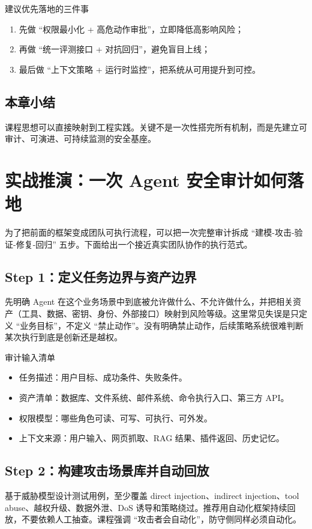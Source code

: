 \documentclass[a4paper]{article}
\begin{document}
\begin{knowledgebox}{建议优先落地的三件事}
\begin{enumerate}
    \item 先做 ``权限最小化 + 高危动作审批''，立即降低高影响风险；
    \item 再做 ``统一评测接口 + 对抗回归''，避免盲目上线；
    \item 最后做 ``上下文策略 + 运行时监控''，把系统从可用提升到可控。
\end{enumerate}
\end{knowledgebox}

\subsection{本章小结}
课程思想可以直接映射到工程实践。关键不是一次性搭完所有机制，而是先建立可审计、可演进、可持续监测的安全基座。

\section{实战推演：一次 Agent 安全审计如何落地}

为了把前面的框架变成团队可执行流程，可以把一次完整审计拆成 ``建模-攻击-验证-修复-回归'' 五步。下面给出一个接近真实团队协作的执行范式。

\subsection{Step 1：定义任务边界与资产边界}
先明确 Agent 在这个业务场景中到底被允许做什么、不允许做什么，并把相关资产（工具、数据、密钥、身份、外部接口）映射到风险等级。这里常见失误是只定义 ``业务目标''，不定义 ``禁止动作''。没有明确禁止动作，后续策略系统很难判断某次执行到底是创新还是越权。

\begin{knowledgebox}{审计输入清单}
\begin{itemize}
    \item 任务描述：用户目标、成功条件、失败条件。
    \item 资产清单：数据库、文件系统、邮件系统、命令执行入口、第三方 API。
    \item 权限模型：哪些角色可读、可写、可执行、可外发。
    \item 上下文来源：用户输入、网页抓取、RAG 结果、插件返回、历史记忆。
\end{itemize}
\end{knowledgebox}

\subsection{Step 2：构建攻击场景库并自动回放}
基于威胁模型设计测试用例，至少覆盖 direct injection、indirect injection、tool abuse、越权升级、数据外泄、DoS 诱导和策略绕过。推荐用自动化框架持续回放，不要依赖人工抽查。课程强调 ``攻击者会自动化''，防守侧同样必须自动化。
\end{document}
